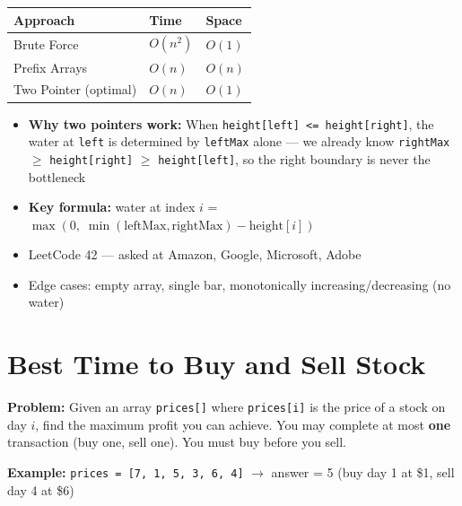 \documentclass[12pt,a4paper,oneside]{book}
\begin{document}
\begin{complexity}
\begin{center}
\begin{tabular}{lll}
\toprule
\textbf{Approach} & \textbf{Time} & \textbf{Space}\\
\midrule
Brute Force              & $O(n^2)$  & $O(1)$\\
Prefix Arrays            & $O(n)$    & $O(n)$\\
Two Pointer (optimal)    & $O(n)$    & $O(1)$\\
\bottomrule
\end{tabular}
\end{center}
\end{complexity}

\begin{interviewcorner}
\begin{itemize}
  \item \textbf{Why two pointers work:} When \texttt{height[left] <= height[right]}, the water at \texttt{left} is determined by \texttt{leftMax} alone --- we already know \texttt{rightMax} $\geq$ \texttt{height[right]} $\geq$ \texttt{height[left]}, so the right boundary is never the bottleneck
  \item \textbf{Key formula:} water at index $i$ = $\max(0,\; \min(\text{leftMax}, \text{rightMax}) - \text{height}[i])$
  \item LeetCode 42 --- asked at Amazon, Google, Microsoft, Adobe
  \item Edge cases: empty array, single bar, monotonically increasing/decreasing (no water)
\end{itemize}
\end{interviewcorner}

\section{Best Time to Buy and Sell Stock}

\textbf{Problem:} Given an array \texttt{prices[]} where \texttt{prices[i]} is the price of a stock on day $i$, find the maximum profit you can achieve. You may complete at most \textbf{one} transaction (buy one, sell one). You must buy before you sell.

\textbf{Example:} \texttt{prices = [7, 1, 5, 3, 6, 4]} $\to$ answer = 5 (buy day 1 at \$1, sell day 4 at \$6)
\end{document}
